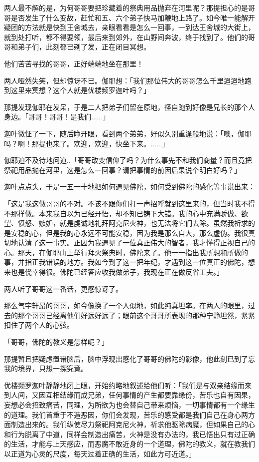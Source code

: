 \documentclass[twoside,openany]{book}
\begin{document}
两人最不解的是，为何哥哥要把珍藏着的祭典用品抛弃在河里呢？那提担心的是哥哥是否发生了什么变故，赶忙和五、六个弟子快马加鞭地上路了。如今唯一能解开疑团的方法就是快到王舍城去，亲眼看看是怎么一回事，一到达王舍城的大街上，就到处打听，都不得要领，最后来到郊外，在山野间奔波，终于找到了。他们的哥哥和弟子们，此刻都已剃了发，正在闭目冥想。

他们苦苦寻找的哥哥，正好端端地坐在那里！

两人哑然失笑，但却惊讶不已。伽耶想：「我们那位伟大的哥哥怎么千里迢迢地跑到这里来冥想？这个人就是优楼频罗迦叶吗？」

那提发现伽耶在发呆，于是二人把弟子们留在原地，径自跑到好像是兄长的那个人身边。「哥哥！哥哥！是我们......」

迦叶微怔了一下，随后睁开眼，看到两个弟弟，好似久别重逢般地说：「噢，伽耶吗？啊！那提也来了。欢迎，欢迎，快坐下来。......」

伽耶迫不及待地问道..「哥哥改变信仰了吗？为什么事先不和我们商量？而且竟把祭祀用品抛在河里，这是怎么一回事？请把事情的前因后果说个明白好吗？」

迦叶点点头，于是一五一十地把如何遇见佛陀，如何受到佛陀的感化等事说出来：

「这是我这做哥哥的不对。不该不跟你们打一声招呼就到这里来的，但当时我不得不那样做。本来我自以为已经开悟，却不知已铸下大错。我的心中充满骄傲、欲望、愤怒、嫉妒，就是虔诚地礼拜阿克尼火神，也无法将它们去除。虽然我祈求的是安稳的心，但是我的心永远不可能安稳，因为我是那么自大，那么虚伪。我很真切地认清了这一事实。正因为我遇见了一位真正伟大的智者，我才懂得正视自己的心。那天，在伽耶山上举行拜火祭典时，佛陀来了。他一一指出我所想和所做的事，并指正我错误的地方。我如今到了这一把年纪，才遇到这一位真正的佛陀，想来也是侥幸得很。佛陀已经答应收我做弟子，我现在正在做反省工夫。」

两人听了哥哥这一番话，更感惊讶了。

那么气宇轩昂的哥哥，如今像换了一个人似地，如此纯真坦率。在两人的眼里，过去的那个哥哥已经离他们好远好远了；眼前这个哥哥所表现的那种宁静坦然，紧紧扣住了两个人的心弦。

「哥哥，佛陀的教义是怎样呢？」

那提暂且把疑虑置诸脑后，脑中浮现出感化了哥哥的佛陀的影像，他此刻已到了忘我的境界，只想一探究竟。

优楼频罗迦叶静静地闭上眼，开始约略地叙述给他们听：「我们是与双亲结缘而来到人间，又因互相结缘而成兄弟，任何事情的产生都要靠缘份，苦乐也自有因果，妄想必会招致痛苦，同理，为所欲为也会替自己带来烦恼，一切事情都有一个缘生的道理。我们首重于不造恶因，你们会发现，苦乐的感受都是我们自己在身心两方面制造出来的。我们纵使尽力祭祀阿克尼火神，祈求他驱除病魔，但如果自己的心和行为脱离了中道，同样会制造出痛苦，火神是没有办法的，我已悟出只有过正确的生活，才能与上天感应，而恶魔不敢近身的一个道理，佛陀的教义，就在教我们以正道为心灵的尺度，每天过着正确的生活，如此方可近道。」
\end{document}
